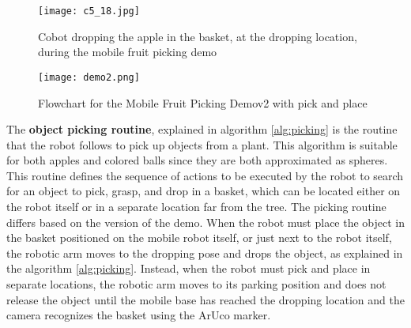 \begin{figure}[t]
    \centering
    \texttt{[image: c5\_18.jpg]}
    \caption{Cobot dropping the apple in the basket, at the dropping location, during the mobile fruit picking demo}
    \label{fig:mfp3}
\end{figure}

\begin{figure}[t]
    \centering
    \texttt{[image: demo2.png]}
    \caption{Flowchart for the Mobile Fruit Picking Demov2 with pick and place}
    \label{fig:mfp_flowchart}
\end{figure}

The \textbf{object picking routine}, explained in algorithm \ref{alg:picking} is the routine that the robot follows
to pick up objects from a plant. This algorithm is suitable for both apples and colored balls since they are
both approximated as spheres. This routine defines the sequence of actions to be executed by the robot
to search for an object to pick, grasp, and drop in a basket, which can be located either on the robot itself
or in a separate location far from the tree.
The picking routine differs based on the version of the demo. When the robot must place the object
in the basket positioned on the mobile robot itself, or just next to the robot itself, the robotic arm moves to
the dropping pose and drops the object, as explained in the algorithm \ref{alg:picking}. Instead, when the robot
must pick and place in separate locations, the robotic arm moves to its parking position and does not release the object
until the mobile base has reached the dropping location and the camera recognizes the basket using the ArUco marker.

